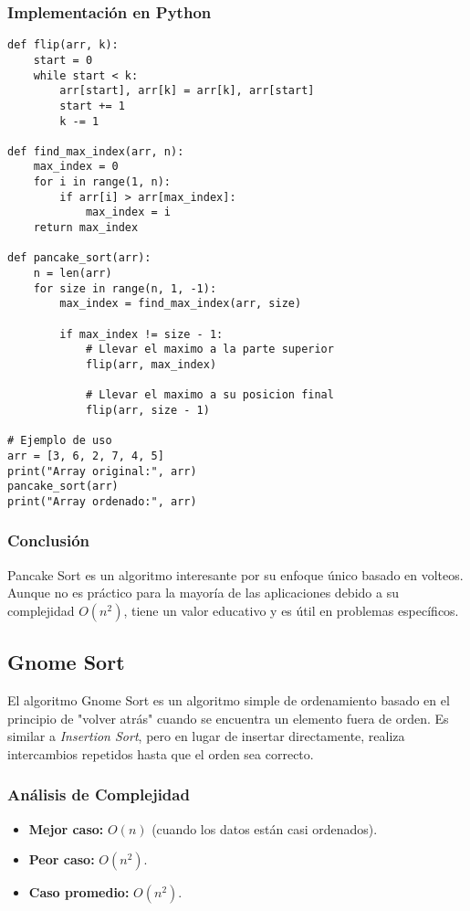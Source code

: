 \documentclass[11pt,openany]{book}
\begin{document}
\subsubsection{Implementación en Python}
\lstset{language=Python}
\begin{lstlisting}
def flip(arr, k):
    start = 0
    while start < k:
        arr[start], arr[k] = arr[k], arr[start]
        start += 1
        k -= 1

def find_max_index(arr, n):
    max_index = 0
    for i in range(1, n):
        if arr[i] > arr[max_index]:
            max_index = i
    return max_index

def pancake_sort(arr):
    n = len(arr)
    for size in range(n, 1, -1):
        max_index = find_max_index(arr, size)

        if max_index != size - 1:
            # Llevar el maximo a la parte superior
            flip(arr, max_index)

            # Llevar el maximo a su posicion final
            flip(arr, size - 1)

# Ejemplo de uso
arr = [3, 6, 2, 7, 4, 5]
print("Array original:", arr)
pancake_sort(arr)
print("Array ordenado:", arr)
\end{lstlisting}

\subsubsection{Conclusión}
Pancake Sort es un algoritmo interesante por su enfoque único basado en volteos. Aunque no es práctico para la mayoría de las aplicaciones debido a su complejidad $O(n^2)$, tiene un valor educativo y es útil en problemas específicos.


\subsection{Gnome Sort}
El algoritmo Gnome Sort es un algoritmo simple de ordenamiento basado en el principio de "volver atrás" cuando se encuentra un elemento fuera de orden. Es similar a \textit{Insertion Sort}, pero en lugar de insertar directamente, realiza intercambios repetidos hasta que el orden sea correcto.

\subsubsection{Análisis de Complejidad}
\begin{itemize}
    \item \textbf{Mejor caso:} $O(n)$ (cuando los datos están casi ordenados).
    \item \textbf{Peor caso:} $O(n^2)$.
    \item \textbf{Caso promedio:} $O(n^2)$.
\end{itemize}
\end{document}
